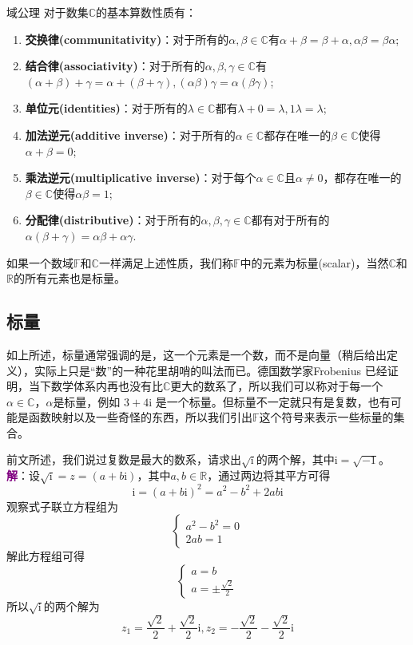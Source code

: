 \begin{axiom}{域公理}
	对于数集$\mathbb{C}$的基本算数性质有：
	\begin{enumerate}
		\item \textbf{交换律(communitativity)}：对于所有的$\alpha,\beta \in \mathbb{C}$有$\alpha+\beta=\beta+\alpha,\alpha\beta=\beta\alpha$;
		\item \textbf{结合律(associativity)}：对于所有的$\alpha,\beta,\gamma \in \mathbb{C}$有$(\alpha+\beta)+\gamma=\alpha+(\beta+\gamma),(\alpha\beta)\gamma=\alpha(\beta\gamma)$;
		\item \textbf{单位元(identities)}：对于所有的$\lambda \in \mathbb{C}$都有$\lambda+0=\lambda,1\lambda=\lambda$;
		\item \textbf{加法逆元(additive inverse)}：对于所有的$\alpha \in \mathbb{C}$都存在唯一的$\beta \in \mathbb{C}$使得$\alpha+\beta=0$;
		\item \textbf{乘法逆元(multiplicative inverse)}：对于每个$\alpha \in\mathbb{C}$且$\alpha\neq 0$，都存在唯一的$\beta \in \mathbb{C}$使得$\alpha\beta=1$;
		\item \textbf{分配律(distributive)}：对于所有的$\alpha,\beta,\gamma \in \mathbb{C}$都有对于所有的$\alpha(\beta+\gamma)=\alpha\beta +\alpha\gamma$.
	\end{enumerate}
\end{axiom}

如果一个数域$\mathbb{F}$和$\mathbb{C}$一样满足上述性质，我们称$\mathbb{F}$中的元素为标量(scalar)，当然$\mathbb{C}$和$\mathbb{R}$的所有元素也是标量。

\subsection{标量}

如上所述，标量通常强调的是，这一个元素是一个数，而不是向量（稍后给出定义），实际上只是``数''的一种花里胡哨的叫法而已。德国数学家Frobenius 已经证明，当下数学体系内再也没有比$\mathbb{C}$更大的数系了，所以我们可以称对于每一个$\alpha \in \mathbb{C}$，$\alpha$是标量，例如 $3+4\mathrm{i}$ 是一个标量。但标量不一定就只有是复数，也有可能是函数映射以及一些奇怪的东西，所以我们引出$\mathbb{F}$这个符号来表示一些标量的集合。

\begin{example}
	前文所述，我们说过复数是最大的数系，请求出$\sqrt{\mathrm{i}}$的两个解，其中$\mathrm{i}=\sqrt{-1}$。
	\tcblower
	\textcolor{purple}{\textbf{解}}：设$\sqrt{\mathrm{i}}=z=(a+b\mathrm{i})$，其中$a,b \in \mathbb{R}$，通过两边将其平方可得$$\mathrm{i}=(a+b\mathrm{i})^2=a^2-b^2+2ab\mathrm{i}$$观察式子联立方程组为$$\left\{\begin{matrix} 
		a^2-b^2=0 \\  
		2ab=1
	\end{matrix}\right. $$
	解此方程组可得$$\left\{\begin{matrix} 
		a=b \\ 
		a=\pm \frac{\sqrt{2} }{2} 
	\end{matrix}\right. $$
	所以$\sqrt{\mathrm{i}}$的两个解为$$z_1=\frac{\sqrt{2}}{2}+\frac{\sqrt{2}}{2}\mathrm{i},z_2=-\frac{\sqrt{2}}{2}-\frac{\sqrt{2}}{2}\mathrm{i}$$
\end{example}

